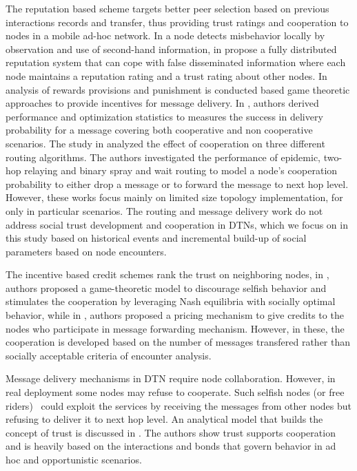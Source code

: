 \documentclass[10pt,conference]{IEEEtran}
\begin{document}
The reputation based scheme targets better peer selection based on previous interactions records and transfer, thus providing trust ratings and cooperation to nodes in a mobile ad-hoc network. In \cite{reputation} a node detects misbehavior locally by observation and use of second-hand information, in \cite{robustreputation} propose a fully distributed reputation system that can cope with false disseminated information where each node maintains a reputation rating and a trust rating about other nodes. In \cite{Pavan03cooperationin,Altman04non-cooperativeforwarding,1032153} analysis of rewards provisions and punishment is conducted based game theoretic approaches to provide incentives for message delivery. In \cite{conf/netcoop/Altman09}, authors derived performance and optimization statistics to measures the success in delivery probability for a message covering both cooperative and non cooperative scenarios. The study in  \cite{coopdtn} analyzed the effect of cooperation on three different routing algorithms. The authors investigated the performance of epidemic, two-hop relaying and binary spray and wait routing to model a node's cooperation probability to either drop a message or to forward the message to next hop level. However, these works focus mainly on limited size topology implementation, for only in particular scenarios. The routing and message delivery work do not address social trust development and cooperation in DTNs, which we focus on in this study based on historical events and incremental build-up of social parameters based on node encounters.

The incentive based credit schemes rank the trust on neighboring nodes, in \cite{4351689}, authors proposed a game-theoretic model to discourage selfish behavior and stimulates the cooperation by leveraging Nash equilibria with socially optimal behavior, while in \cite{sprite}, authors proposed a pricing mechanism to give credits to the nodes who participate in message forwarding mechanism. However, in these, the cooperation is developed based on the number of messages transfered rather than socially acceptable criteria of encounter analysis. 

Message delivery mechanisms in DTN require node collaboration. However, in real deployment some nodes may refuse to cooperate. Such selfish nodes (or free riders)~\cite{And02simulation-basedanalysis} could exploit the services by receiving the messages from other nodes but refusing to deliver it to next hop level. An analytical model that builds the concept of trust is discussed in  \cite{Marti00mitigatingrouting,proptrust}. The authors show trust supports cooperation and is heavily based on the interactions and bonds that govern behavior in ad hoc and opportunistic scenarios.
\end{document}
